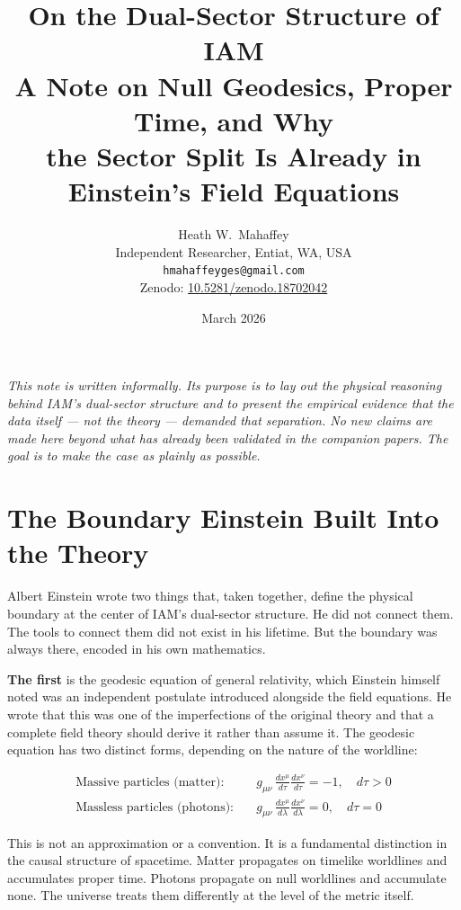 \documentclass[12pt]{article}
\title{\textbf{On the Dual-Sector Structure of IAM}\\[4pt]
\large A Note on Null Geodesics, Proper Time, and Why\\
the Sector Split Is Already in Einstein's Field Equations}
\author{Heath W.\ Mahaffey\\
\small Independent Researcher, Entiat, WA, USA\\
\small \texttt{hmahaffeyges@gmail.com}\\
\small Zenodo: \href{https://doi.org/10.5281/zenodo.18702042}{10.5281/zenodo.18702042}}
\date{March 2026}
\begin{document}
\maketitle

\begin{notebox}
\noindent\textit{This note is written informally. Its purpose is to lay out the physical
reasoning behind IAM's dual-sector structure and to present the empirical
evidence that the data itself — not the theory — demanded that separation.
No new claims are made here beyond what has already been validated in the
companion papers. The goal is to make the case as plainly as possible.}
\end{notebox}

\vspace{6pt}

\section{The Boundary Einstein Built Into the Theory}

Albert Einstein wrote two things that, taken together, define the
physical boundary at the center of IAM's dual-sector structure. He did
not connect them. The tools to connect them did not exist in his
lifetime. But the boundary was always there, encoded in his own
mathematics.

\textbf{The first} is the geodesic equation of general relativity, which
Einstein himself noted was an independent postulate introduced alongside
the field equations. He wrote that this was one of the imperfections of
the original theory and that a complete field theory should derive it
rather than assume it. The geodesic equation has two distinct forms,
depending on the nature of the worldline:

\begin{align}
\text{Massive particles (matter):} \quad &
g_{\mu\nu}\,\frac{dx^\mu}{d\tau}\frac{dx^\nu}{d\tau} = -1,
\quad d\tau > 0 \label{eq:timelike}\\[6pt]
\text{Massless particles (photons):} \quad &
g_{\mu\nu}\,\frac{dx^\mu}{d\lambda}\frac{dx^\nu}{d\lambda} = 0,
\quad d\tau = 0 \label{eq:null}
\end{align}

This is not an approximation or a convention. It is a fundamental
distinction in the causal structure of spacetime. Matter propagates on
timelike worldlines and accumulates proper time. Photons propagate on
null worldlines and accumulate none. The universe treats them
differently at the level of the metric itself.
\end{document}
